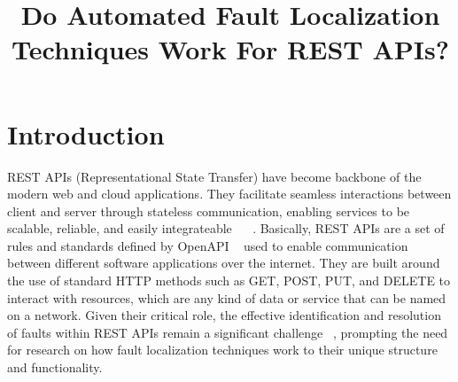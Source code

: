 \documentclass[conference]{IEEEtran}
\begin{document}
\title{Do Automated Fault Localization Techniques Work For REST APIs?}

\author{
\and
{}
\and
{}
}

\maketitle

\begin{abstract}

\end{abstract}

\begin{IEEEkeywords}

\end{IEEEkeywords}


\section{Introduction}
\label{sec:introduction}

    REST APIs (Representational State Transfer) have become backbone of the modern web and cloud applications. They facilitate seamless interactions between client and server through stateless communication, enabling services to be scalable, reliable, and easily integrateable ~\cite{li2016} ~\cite{neumann2018}. Basically, REST APIs are a set of rules and standards  defined by OpenAPI ~\cite{ed-douibi2018} used to enable communication between different software applications over the internet. They are built around the use of standard HTTP methods such as GET, POST, PUT, and DELETE to interact with resources, which are any kind of data or service that can be named on a network.
    Given their critical role, the effective identification and resolution of faults within REST APIs remain a significant challenge ~\cite{barbir2007}, prompting the need for research on how fault localization techniques work to their unique structure and functionality.
\end{document}
